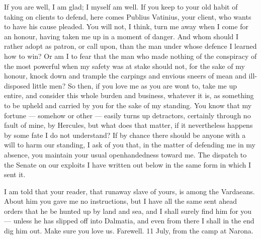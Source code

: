 

 If you are well, I am glad; I myself am well. If you keep to your old habit of taking on clients to defend, here comes Publius Vatinius, your client, who wants to have his cause pleaded. You will not, I think, turn me away when I come for an honour, having taken me up in a moment of danger. And whom should I rather adopt as patron, or call upon, than the man under whose defence I learned how to win? Or am I to fear that the man who made nothing of the conspiracy of the most powerful when my safety was at stake should not, for the sake of my honour, knock down and trample the carpings and envious sneers of mean and ill-disposed little men? So then, if you love me as you are wont to, take me up entire, and consider this whole burden and business, whatever it is, as something to be upheld and carried by you for the sake of my standing. You know that my fortune --- somehow or other --- easily turns up detractors, certainly through no fault of mine, by Hercules, but what does that matter, if it nevertheless happens by some fate I do not understand? If by chance there should be anyone with a will to harm our standing, I ask of you that, in the matter of defending me in my absence, you maintain your usual openhandedness toward me. The dispatch to the Senate on our exploits I have written out below in the same form in which I sent it.

 I am told that your reader, that runaway slave of yours, is among the Vardaeans. About him you gave me no instructions, but I have all the same sent ahead orders that he be hunted up by land and sea, and I shall surely find him for you --- unless he has slipped off into Dalmatia, and even from there I shall in the end dig him out. Make sure you love us. Farewell. 11 July, from the camp at Narona.
